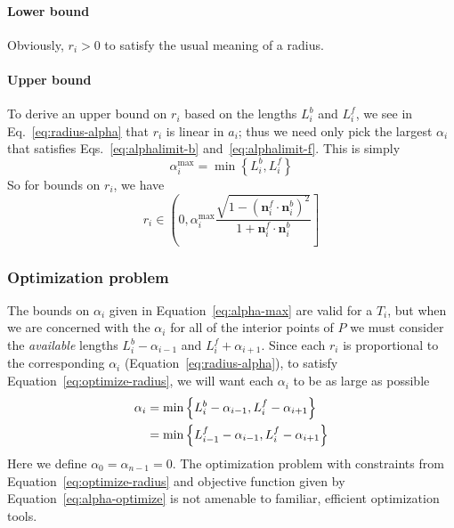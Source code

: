 \documentclass{article}
\begin{document}
\paragraph{Lower bound}
%
Obviously, $r_i > 0$ to satisfy the usual meaning of a radius.
%
\paragraph{Upper bound}
%
To derive an upper bound on $r_{i}$ based on the lengths $L^b_i$ and $L^f_i$, we see in Eq.~\eqref{eq:radius-alpha} that $r_{i}$ is linear in $a_{i}$; thus we need only pick the largest $\alpha_i$ that satisfies Eqs.~\eqref{eq:alphalimit-b} and~\eqref{eq:alphalimit-f}.  This is simply
%
\begin{equation}
  \label{eq:alpha-max}
  \alpha^{\max}_i = \min \left\{L^{b}_{i}, L^{f}_{i}\right\}
\end{equation}
%
So for bounds on $r_{i}$, we have
%
\begin{equation}
  \label{eq:rbounds}
  r_{i} \in \left(0, \alpha^{\max}_i \frac{\sqrt{1-\left(\mathbf{n}^f_i\cdot \mathbf{n}^b_i\right)^{2}}}{1+\mathbf{n}^f_i\cdot \mathbf{n}^b_i}\right]
\end{equation}
%
\subsubsection{Optimization problem}
\label{sec:optimization}
%
The bounds on $\alpha_i$ given in Equation~\eqref{eq:alpha-max} are valid for a $T_{i}$, but when we are concerned with the $\alpha_i$ for all of the interior points of $P$ we must consider the \emph{available} lengths $L^{b}_{i}-\alpha_{i-1}$ and $L^{f}_{i}+\alpha_{i+1}$.  Since each $r_{i}$ is proportional to the corresponding $\alpha_i$ (Equation~\eqref{eq:radius-alpha}), to satisfy Equation~\eqref{eq:optimize-radius}, we will want each $\alpha_i$ to be as large as possible
%
\begin{align}
  \notag
  \alpha_i &= \min \left\{L^{b}_{i}-\alpha_{i-1}, L^{f}_{i}-\alpha_{i+1}\right\} \\
  \label{eq:alpha-optimize}
  &= \min \left\{L^{f}_{i-1}-\alpha_{i-1}, L^{f}_{i}-\alpha_{i+1}\right\}
\end{align}
%
Here we define $\alpha_0 = \alpha_{n-1} = 0$.  The optimization problem with constraints from Equation~\eqref{eq:optimize-radius} and objective function given by Equation~\eqref{eq:alpha-optimize} is not amenable to familiar, efficient optimization tools.
%
\end{document}
